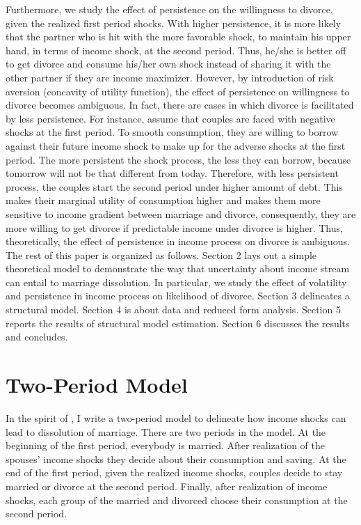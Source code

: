 Furthermore, we study the effect of persistence on the willingness to divorce, given the realized first period shocks. With higher persistence, it is more likely that the partner who is hit with the more favorable shock, to maintain his upper hand, in terms of income shock, at the second period. Thus, he/she is better off to get divorce and consume his/her own shock instead of sharing it with the other partner if they are income maximizer. However, by introduction of risk aversion (concavity of utility function), the effect of persistence on willingness to divorce becomes ambiguous. In fact, there are cases in which divorce is facilitated by less persistence. For instance, assume that couples are faced with negative shocks at the first period. To smooth consumption, they are willing to borrow against their future income shock to make up for the adverse shocks at the first period. The more persistent the shock process, the less they can borrow, because tomorrow will not be that different from today.  Therefore, with less persistent process, the couples start the second period under higher amount of debt.  This makes their marginal utility of consumption higher and makes them more sensitive to income gradient between marriage and divorce, consequently, they are more willing to get divorce if predictable income under divorce is higher. Thus, theoretically, the effect of persistence in income process on divorce is ambiguous. \\

The rest of this paper is organized as follows. Section 2 lays out a simple theoretical model to demonstrate the way that uncertainty about income stream can entail to marriage dissolution. In particular, we study the effect of volatility and persistence in income process on likelihood of divorce. Section 3 delineates a structural model. Section 4 is about data and reduced form analysis. Section 5 reports the results of structural model estimation. Section 6 discusses the results and concludes. \\


\section{Two-Period Model} 

In the spirit of \citet{Hess_2004}, I write a two-period model to delineate how income shocks can lead to dissolution of marriage. There are two periods in the model. At the beginning of the first period, everybody is married. After realization of the spouses' income shocks they decide about their consumption and saving. At the end of the first period, given the realized income shocks, couples decide to stay married or divorce at the second period. Finally, after realization of income shocks, each group of the married and divorced choose their consumption at the second period. 

